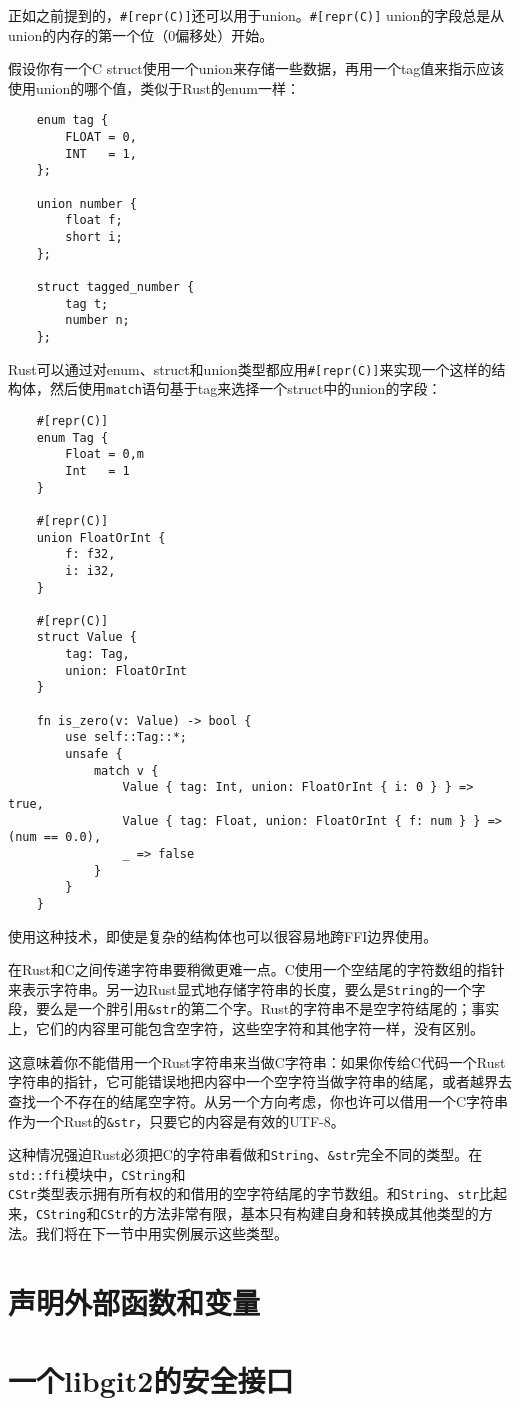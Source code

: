 正如之前提到的，\texttt{\#[repr(C)]}还可以用于union。\texttt{\#[repr(C)]} union的字段总是从union的内存的第一个位（0偏移处）开始。

假设你有一个C struct使用一个union来存储一些数据，再用一个tag值来指示应该使用union的哪个值，类似于Rust的enum一样：
\begin{verbatim}
    enum tag {
        FLOAT = 0,
        INT   = 1,
    };

    union number {
        float f;
        short i;
    };

    struct tagged_number {
        tag t;
        number n;
    };
\end{verbatim}

Rust可以通过对enum、struct和union类型都应用\texttt{\#[repr(C)]}来实现一个这样的结构体，然后使用\texttt{match}语句基于tag来选择一个struct中的union的字段：
\begin{verbatim}
    #[repr(C)]
    enum Tag {
        Float = 0,m
        Int   = 1
    }

    #[repr(C)]
    union FloatOrInt {
        f: f32,
        i: i32,
    }

    #[repr(C)]
    struct Value {
        tag: Tag,
        union: FloatOrInt
    }

    fn is_zero(v: Value) -> bool {
        use self::Tag::*;
        unsafe {
            match v {
                Value { tag: Int, union: FloatOrInt { i: 0 } } => true,
                Value { tag: Float, union: FloatOrInt { f: num } } => (num == 0.0),
                _ => false
            }
        }
    }
\end{verbatim}

使用这种技术，即使是复杂的结构体也可以很容易地跨FFI边界使用。

在Rust和C之间传递字符串要稍微更难一点。C使用一个空结尾的字符数组的指针来表示字符串。另一边Rust显式地存储字符串的长度，要么是\texttt{String}的一个字段，要么是一个胖引用\texttt{\&str}的第二个字。Rust的字符串不是空字符结尾的；事实上，它们的内容里可能包含空字符，这些空字符和其他字符一样，没有区别。

这意味着你不能借用一个Rust字符串来当做C字符串：如果你传给C代码一个Rust字符串的指针，它可能错误地把内容中一个空字符当做字符串的结尾，或者越界去查找一个不存在的结尾空字符。从另一个方向考虑，你也许可以借用一个C字符串作为一个Rust的\texttt{\&str}，只要它的内容是有效的UTF-8。

这种情况强迫Rust必须把C的字符串看做和\texttt{String}、\texttt{\&str}完全不同的类型。在\texttt{std::ffi}模块中，\texttt{CString}和\\
\texttt{CStr}类型表示拥有所有权的和借用的空字符结尾的字节数组。和\texttt{String}、\texttt{str}比起来，\texttt{CString}和\texttt{CStr}的方法非常有限，基本只有构建自身和转换成其他类型的方法。我们将在下一节中用实例展示这些类型。

\section{声明外部函数和变量}

\section{一个libgit2的安全接口}\label{SafeInter}